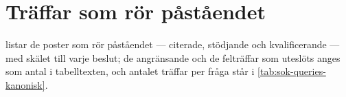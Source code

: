 \section{Träffar som rör påståendet}
\label{sec:kan-traffar}

 listar de poster som rör påståendet ---
citerade, stödjande och kvalificerande --- med skälet till varje beslut;
de angränsande och de felträffar som uteslöts anges som antal i
tabelltexten, och antalet träffar per fråga står i
\cref{tab:sok-queries-kanonisk}.
